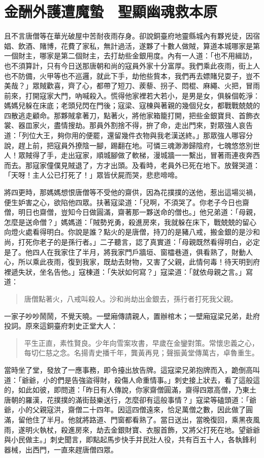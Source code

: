 
\chapter{金酬外護遭魔蟄　聖顯幽魂救本原}

且不言唐僧等在華光破屋中苦耐夜雨存身。卻說銅臺府地靈縣城內有夥兇徒，因宿娼、飲酒、賭博，花費了家私，無計過活，遂夥了十數人做賊，算道本城哪家是第一個財主，哪家是第二個財主，去打劫些金銀用度。內有一人道：「也不用緝訪，也不須算計，只有今日送那唐朝和尚的寇員外家十分富厚。我們乘此夜雨，街上人也不防備，火甲等也不巡邏，就此下手，劫他些貲本，我們再去嫖賭兒耍子，豈不美哉？」眾賊歡喜，齊了心，都帶了短刀、蒺藜、拐子、悶棍、麻繩、火把，冒雨前來，打開寇家大門，吶喊殺入。慌得他家裡若大若小，是男是女，俱躲個乾淨：媽媽兒躲在床底；老頭兒閃在門後；寇梁、寇棟與著親的幾個兒女，都戰戰兢兢的四散逃走顧命。那夥賊拿著刀，點著火，將他家箱籠打開，把些金銀寶貝、首飾衣裳、器皿家火，盡情搜劫。那員外割捨不得，拚了命，走出門來，對眾強人哀告道：「列位大王，夠你用的便罷，還留幾件衣物與我老漢送終。」那眾強人哪容分說，趕上前，把寇員外撩陰一腳，踢翻在地。可憐三魂渺渺歸陰府，七魄悠悠別世人！眾賊得了手，走出寇家，順城腳做了軟梯，漫城牆一一繫出，冒著雨連夜奔西而去。那寇家僮僕見賊退了，方才出頭。及看時，老員外已死在地下。放聲哭道：「天呀！主人公已打死了！」眾皆伏屍而哭，悲悲啼啼。

將四更時，那媽媽想恨唐僧等不受他的齋供，因為花撲撲的送他，惹出這場災禍，便生妒害之心，欲陷他四眾。扶著寇梁道：「兒啊，不須哭了。你老子今日也齋僧，明日也齋僧，豈知今日做圓滿，齋著那一夥送命的僧也。」他兄弟道：「母親，怎麼是送命僧？」媽媽道：「賊勢兇勇，殺進房來，我就躲在床下，戰兢兢的留心向燈火處看得明白。你說是誰？點火的是唐僧，持刀的是豬八戒，搬金銀的是沙和尚，打死你老子的是孫行者。」二子聽言，認了真實道：「母親既然看得明白，必定是了。他四人在我家住了半月，將我家門戶牆垣、窗櫺巷道，俱看熟了，財動人心，所以乘此夜雨，復到我家，既劫去財物，又害了父親，此情何毒！待天明到府裡遞失狀，坐名告他。」寇棟道：「失狀如何寫？」寇梁道：「就依母親之言。」寫道：
\begin{quote}
唐僧點著火，八戒叫殺人。沙和尚劫出金銀去，孫行者打死我父親。
\end{quote}

一家子吵吵鬧鬧，不覺天曉。一壁廂傳請親人，置辦棺木；一壁廂寇梁兄弟，赴府投詞。原來這銅臺府刺史正堂大人：
\begin{quote}
平生正直，素性賢良。少年向雪案攻書，早歲在金鑾對策。常懷忠義之心，每切仁慈之念。名揚青史播千年，龔黃再見；聲振黃堂傳萬古，卓魯重生。
\end{quote}

當時坐了堂，發放了一應事務，即令擡出放告牌。這寇梁兄弟抱牌而入，跪倒高叫道：「爺爺，小的們是告強盜得財，殺傷人命重情事。」刺史接上狀去，看了這般這的，如此如彼，即問道：「昨日有人傳說，你家齋僧圓滿，齋得四眾高僧，乃東土唐朝的羅漢，花撲撲的滿街鼓樂送行，怎麼卻有這般事情？」寇梁等磕頭道：「爺爺，小的父親寇洪，齋僧二十四年。因這四僧遠來，恰足萬僧之數，因此做了圓滿，留他住了半月。他就將路道、門窗都看熟了。當日送出，當晚復回，乘黑夜風雨，遂明火執杖，殺進房來，劫去金銀財寶、衣服首飾，又將父打死在地。望爺爺與小民做主。」刺史聞言，即點起馬步快手并民壯人役，共有百五十人，各執鋒利器械，出西門，一直來趕唐僧四眾。

